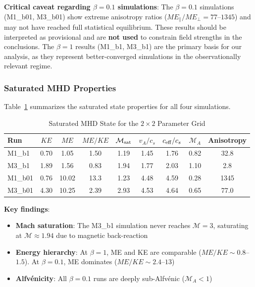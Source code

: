 \documentclass[11pt,a4paper]{article}
\begin{document}
\textbf{Critical caveat regarding $\beta = 0.1$ simulations}: The $\beta = 0.1$ simulations (M1\_b01, M3\_b01) show extreme anisotropy ratios ($ME_\parallel/ME_\perp = 77$--$1345$) and may not have reached full statistical equilibrium. These results should be interpreted as provisional and are \textbf{not used} to constrain field strengths in the conclusions. The $\beta = 1$ results (M1\_b1, M3\_b1) are the primary basis for our analysis, as they represent better-converged simulations in the observationally relevant regime.

\subsubsection{Saturated MHD Properties}

Table~\ref{tab:mhd_saturated} summarizes the saturated state properties for all four simulations.

\begin{table}[H]
\centering
\caption{Saturated MHD State for the $2\times2$ Parameter Grid}
\label{tab:mhd_saturated}
\begin{tabular}{lcccccccc}
\toprule
Run & $KE$ & $ME$ & $ME/KE$ & $\mathcal{M}_{\rm sat}$ & $v_A/c_s$ & $c_{\rm eff}/c_s$ & $\mathcal{M}_A$ & Anisotropy \\
\midrule
M1\_b1  & 0.70 & 1.05 & 1.50 & 1.19 & 1.45 & 1.76 & 0.82 & 32.8 \\
M3\_b1  & 1.89 & 1.56 & 0.83 & 1.94 & 1.77 & 2.03 & 1.10 & 2.8 \\
M1\_b01 & 0.76 & 10.02 & 13.3 & 1.23 & 4.48 & 4.59 & 0.28 & 1345 \\
M3\_b01 & 4.30 & 10.25 & 2.39 & 2.93 & 4.53 & 4.64 & 0.65 & 77.0 \\
\bottomrule
\end{tabular}
\end{table}

\noindent\textbf{Key findings}:
\begin{itemize}
    \item \textbf{Mach saturation}: The M3\_b1 simulation never reaches $\mathcal{M} = 3$, saturating at $\mathcal{M} \approx 1.94$ due to magnetic back-reaction
    \item \textbf{Energy hierarchy}: At $\beta = 1$, ME and KE are comparable ($ME/KE \sim 0.8$--$1.5$). At $\beta = 0.1$, ME dominates ($ME/KE \sim 2.4$--$13$)
    \item \textbf{Alfv\'enicity}: All $\beta = 0.1$ runs are deeply sub-Alfv\'enic ($\mathcal{M}_A < 1$)
\end{itemize}
\end{document}
